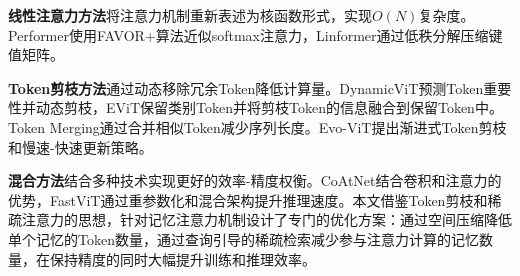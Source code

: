 \textbf{线性注意力方法}\cite{katharopoulos2020transformers,choromanski2020rethinking}将注意力机制重新表述为核函数形式，实现$O(N)$复杂度。Performer\cite{choromanski2020rethinking}使用FAVOR+算法近似softmax注意力，Linformer\cite{wang2020linformer}通过低秩分解压缩键值矩阵。

\textbf{Token剪枝方法}\cite{rao2021dynamicvit,liang2022not,bolya2022token}通过动态移除冗余Token降低计算量。DynamicViT\cite{rao2021dynamicvit}预测Token重要性并动态剪枝，EViT\cite{liang2022not}保留类别Token并将剪枝Token的信息融合到保留Token中。Token Merging\cite{bolya2022token}通过合并相似Token减少序列长度。Evo-ViT\cite{xu2022evo}提出渐进式Token剪枝和慢速-快速更新策略。

\textbf{混合方法}结合多种技术实现更好的效率-精度权衡。CoAtNet\cite{dai2021coatnet}结合卷积和注意力的优势，FastViT\cite{vasu2023fastvit}通过重参数化和混合架构提升推理速度。本文借鉴Token剪枝和稀疏注意力的思想，针对记忆注意力机制设计了专门的优化方案：通过空间压缩降低单个记忆的Token数量，通过查询引导的稀疏检索减少参与注意力计算的记忆数量，在保持精度的同时大幅提升训练和推理效率。
